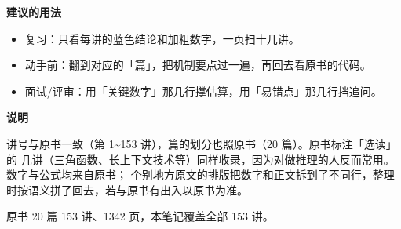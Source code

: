 \documentclass[UTF8,10.5pt,openany]{ctexbook}
\begin{document}
\vspace{4pt}
{\sffamily\bfseries 建议的用法}\par
\vspace{2pt}
\begin{itemize}[leftmargin=1.6em,itemsep=2pt,topsep=2pt]
\item 复习：只看每讲的蓝色结论和加粗数字，一页扫十几讲。
\item 动手前：翻到对应的「篇」，把机制要点过一遍，再回去看原书的代码。
\item 面试/评审：用「关键数字」那几行撑估算，用「易错点」那几行挡追问。
\end{itemize}

\vspace{6pt}
{\sffamily\bfseries 说明}\par
\vspace{2pt}
讲号与原书一致（第 1\textasciitilde 153 讲），篇的划分也照原书（20 篇）。原书标注「选读」的
几讲（三角函数、长上下文技术等）同样收录，因为对做推理的人反而常用。数字与公式均来自原书；
个别地方原文的排版把数字和正文拆到了不同行，整理时按语义拼了回去，若与原书有出入以原书为准。

\vspace{8pt}
{\footnotesize\color{grayt}原书 20 篇 153 讲、1342 页，本笔记覆盖全部 153 讲。}
\clearpage


\tableofcontents
\clearpage
\end{document}

